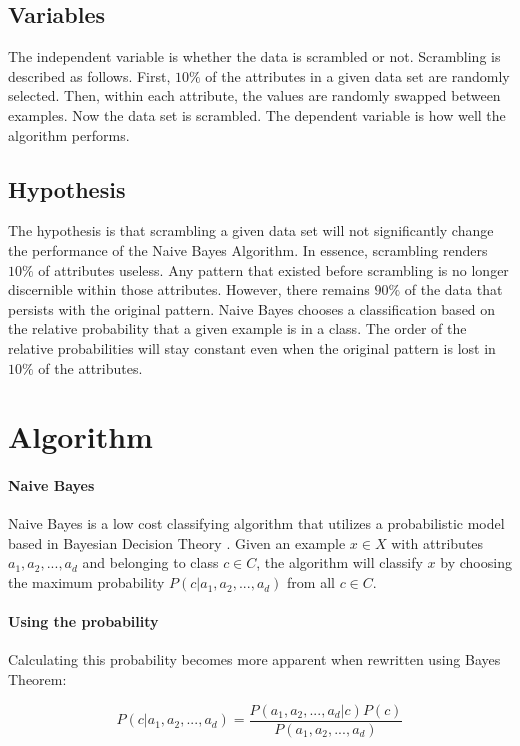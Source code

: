 \documentclass[twoside,11pt]{article}
\begin{document}
\subsection{Variables}

The independent variable is whether the data is scrambled or not. Scrambling is described as follows. First, $10\%$ of the attributes in a given data set are randomly selected. Then, within each attribute, the values are randomly swapped between examples. Now the data set is scrambled. The dependent variable is how well the algorithm performs.

\subsection{Hypothesis}

The hypothesis is that scrambling a given data set will not significantly change the performance of the Naive Bayes Algorithm. In essence, scrambling renders $10\%$ of attributes useless. Any pattern that existed before scrambling is no longer discernible within those attributes. However, there remains $90\%$ of the data that persists with the original pattern. Naive Bayes chooses a classification based on the relative probability that a given example is in a class. The order of the relative probabilities will stay constant even when the original pattern is lost in $10\%$ of the attributes.

\section{Algorithm}

\paragraph{Naive Bayes}Naive Bayes is a low cost classifying algorithm that utilizes a probabilistic model based in Bayesian Decision Theory \citep{nbPaper:2014}. Given an example $x \in X$ with attributes $a_1, a_2, ..., a_d$ and belonging to class $c \in C$, the algorithm will classify $x$ by choosing the maximum probability $P(c|a_1, a_2, ..., a_d)$ from all $c \in C$.

\paragraph{Using the probability}Calculating this probability becomes more apparent when rewritten using Bayes Theorem:

$$P(c|a_1, a_2, ..., a_d) = \frac{P(a_1, a_2, ..., a_d | c)P(c)}{P(a_1, a_2, ..., a_d)} $$
\end{document}
